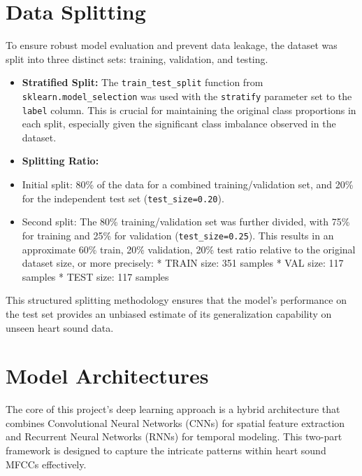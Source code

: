 \documentclass[a4paper]{article}
\begin{document}
\begin{multicols}{2}
\section{Data Splitting}
To ensure robust model evaluation and prevent data leakage, the dataset was split into three distinct sets: training, validation, and testing.
\begin{itemize}
    \item \textbf{Stratified Split:} The \texttt{train\_test\_split} function from \texttt{sklearn.model\_selection} was used with the \texttt{stratify} parameter set to the \texttt{label} column. This is crucial for maintaining the original class proportions in each split, especially given the significant class imbalance observed in the dataset.
    \item \textbf{Splitting Ratio:}
        \item Initial split: 80\% of the data for a combined training/validation set, and 20\% for the independent test set (\texttt{test\_size=0.20}).
        \item Second split: The 80\% training/validation set was further divided, with 75\% for training and 25\% for validation (\texttt{test\_size=0.25}). This results in an approximate 60\% train, 20\% validation, 20\% test ratio relative to the original dataset size, or more precisely:
            * TRAIN size: 351 samples 
            * VAL size: 117 samples 
            * TEST size: 117 samples 
\end{itemize}
This structured splitting methodology ensures that the model's performance on the test set provides an unbiased estimate of its generalization capability on unseen heart sound data.

\section{Model Architectures}
The core of this project's deep learning approach is a hybrid architecture that combines Convolutional Neural Networks (CNNs) for spatial feature extraction and Recurrent Neural Networks (RNNs) for temporal modeling. This two-part framework is designed to capture the intricate patterns within heart sound MFCCs effectively.


\end{multicols}
\end{document}
